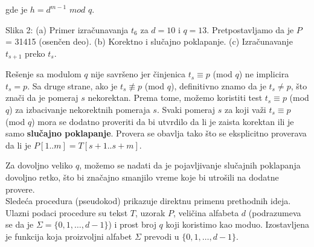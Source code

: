 \documentclass[a4paper,12pt]{article}
\begin{document}
gde je $h = d^{m - 1}$ $mod$ $q$.
\\

\begin{center}
Slika 2: (a) Primer izra\v cunavanja $t_6$ za $d = 10$ i $q = 13$. Pretpostavljamo da je $P$ = 31415 (osen\v cen deo). (b) Korektno i slu\v cajno poklapanje. (c) Izra\v cunavanje $t_{s + 1}$ preko $t_s$.
\end{center}

Re\v senje sa modulom $q$ nije savr\v seno jer \v cinjenica $t_s \equiv p$ (mod $q$) ne implicira $t_s = p$. Sa druge strane, ako je $t_s \not\equiv p$ (mod $q$), definitivno znamo da je $t_s \neq p$, \v sto zna\v ci da je pomeraj $s$ nekorektan. Prema tome, mo\v zemo koristiti test $t_s \equiv p$ (mod $q$) za izbacivanje nekorektnih pomeraja $s$. Svaki pomeraj $s$ za koji va\v zi $t_s \equiv p$ (mod $q$) mora se dodatno proveriti da bi utvrdilo da li je zaista korektan ili je samo {\bf slu\v cajno poklapanje}. Provera se obavlja tako \v sto se eksplicitno proverava da li je $P[1..m] = T[s + 1..s + m]$.

Za dovoljno veliko $q$, mo\v zemo se nadati da je pojavljivanje slu\v cajnih poklapanja dovoljno retko, \v sto bi zna\v cajno smanjilo vreme koje bi utro\v sili na dodatne provere.
\\

Slede\' ca procedura (pseudokod) prikazuje direktnu primenu prethodnih ideja. Ulazni podaci procedure su tekst $T$, uzorak $P$, veli\v cina alfabeta $d$ (podrazumeva se da je $\Sigma = \{ 0, 1, \ldots, d - 1 \}$) i prost broj $q$ koji koristimo kao moduo. Izostavljena je funkcija koja proizvoljni alfabet $\Sigma$ prevodi u
$\{ 0, 1, \ldots, d - 1 \}$.
\\
\end{document}
